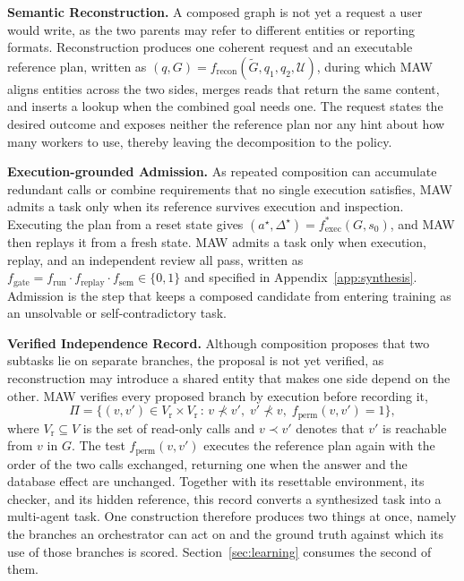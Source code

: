 \textbf{Semantic Reconstruction.}\quad
A composed graph is not yet a request a user would write, as the two parents may refer to different entities or reporting formats.
Reconstruction produces one coherent request and an executable reference plan, written as $(q,G)=f_{\mathrm{recon}}(\tilde{G},q_1,q_2,\mathcal{U})$, during which MAW aligns entities across the two sides, merges reads that return the same content, and inserts a lookup when the combined goal needs one.
The request states the desired outcome and exposes neither the reference plan nor any hint about how many workers to use, thereby leaving the decomposition to the policy.

\textbf{Execution-grounded Admission.}\quad
As repeated composition can accumulate redundant calls or combine requirements that no single execution satisfies, MAW admits a task only when its reference survives execution and inspection.
Executing the plan from a reset state gives $(a^{\star},\Delta^{\star})=f_{\mathrm{exec}}^{\ast}(G,s_0)$, and MAW then replays it from a fresh state.
MAW admits a task only when execution, replay, and an independent review all pass, written as $f_{\mathrm{gate}}=f_{\mathrm{run}}\cdot f_{\mathrm{replay}}\cdot f_{\mathrm{sem}}\in\{0,1\}$ and specified in Appendix~\ref{app:synthesis}.
Admission is the step that keeps a composed candidate from entering training as an unsolvable or self-contradictory task.

\textbf{Verified Independence Record.}\quad
Although composition proposes that two subtasks lie on separate branches, the proposal is not yet verified, as reconstruction may introduce a shared entity that makes one side depend on the other.
MAW verifies every proposed branch by execution before recording it,
\begin{equation}
\Pi=\bigl\{(v,v')\in V_{\mathrm{r}}\times V_{\mathrm{r}} \,:\, v\nprec v',\; v'\nprec v,\; f_{\mathrm{perm}}(v,v')=1\bigr\},
\label{eq:pi}
\end{equation}
where $V_{\mathrm{r}}\subseteq V$ is the set of read-only calls and $v\prec v'$ denotes that $v'$ is reachable from $v$ in $G$.
The test $f_{\mathrm{perm}}(v,v')$ executes the reference plan again with the order of the two calls exchanged, returning one when the answer and the database effect are unchanged.
Together with its resettable environment, its checker, and its hidden reference, this record converts a synthesized task into a multi-agent task.
One construction therefore produces two things at once, namely the branches an orchestrator can act on and the ground truth against which its use of those branches is scored.
Section~\ref{sec:learning} consumes the second of them.


